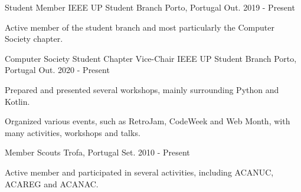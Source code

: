 
\begin{cventries}
	\cventry
		{Student Member} 
		{IEEE UP Student Branch} 
		{Porto, Portugal}
		{Out. 2019 - Present} 
		{
			\begin{cvitems} 
				\item {Active member of the student branch and most particularly the Computer Society chapter.}
			\end{cvitems}
		}
		
	\cventry
		{Computer Society Student Chapter Vice-Chair} 
		{IEEE UP Student Branch} 
		{Porto, Portugal}
		{Out. 2020 - Present} 
		{
			\begin{cvitems} 
				\item {Prepared and presented several workshops, mainly surrounding Python and Kotlin.}
				\item {Organized various events, such as RetroJam, CodeWeek and Web Month, with many activities, workshops and talks.}
			\end{cvitems}
		}
		
	\cventry
		{Member} 
		{Scouts} 
		{Trofa, Portugal}
		{Set. 2010 - Present} 
		{
			\begin{cvitems} 
				\item {Active member and participated in several activities, including ACANUC, ACAREG and ACANAC.}
			\end{cvitems}
		}
\end{cventries}
